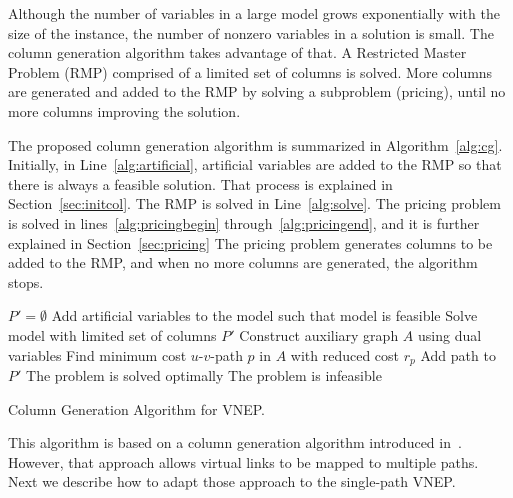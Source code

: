 \documentclass[conference]{IEEEtran}
\begin{document}
Although the number of variables in a large model grows exponentially with the size of the instance,
the number of nonzero variables in a solution is small.
The column generation algorithm takes advantage of that.
A Restricted Master Problem (RMP) comprised of a limited set of columns is solved.
More columns are generated and added to the RMP by solving a subproblem (pricing), until no more columns improving the solution.

The proposed column generation algorithm is summarized in Algorithm~\ref{alg:cg}.
Initially, in Line~\ref{alg:artificial}, artificial variables are added to the RMP so that there is always a feasible solution.
That process is explained in Section~\ref{sec:initcol}.
The RMP is solved in Line~\ref{alg:solve}.
The pricing problem is solved in lines~\ref{alg:pricingbegin} through~\ref{alg:pricingend},
and it is further explained in Section~\ref{sec:pricing}
The pricing problem generates columns to be added to the RMP, and when no more columns are generated, the algorithm stops.

\begin{algorithm}
$P' = \emptyset$\;
Add artificial variables to the model such that model is feasible\; \label{alg:artificial}
  {Solve model with limited set of columns $P'$\; \label{alg:solve}
    {Construct auxiliary graph $A$ using dual variables\; \label{alg:aux}
    Find minimum cost $u$-$v$-path $p$ in $A$ with reduced cost $r_{p}$\; \label{alg:findpaths}
      {Add path to $P'$\;}
    } \label{alg:pricingend}
  }
  {The problem is solved optimally\;}
  {The problem is infeasible\;}
\caption{Column Generation Algorithm for VNEP.}
\label{alg:cg}
\end{algorithm}

This algorithm is based on a column generation algorithm introduced in~\cite{hu:2013}.
However, that approach allows virtual links to be mapped to multiple paths.
Next we describe how to adapt those approach to the single-path VNEP.
\end{document}
